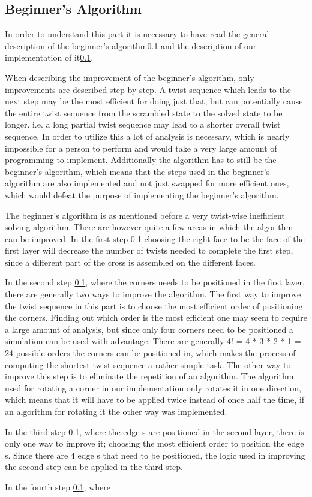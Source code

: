

\subsection{Beginner's Algorithm} %
In order to understand this part it is necessary to have read the general description of the beginner's algorithm\ref{} and the description of our implementation of it\ref{}. 

When describing the improvement of the beginner's algorithm, only improvements are described step by step. 
A twist sequence which leads to the next step may be the most efficient for doing just that, but can potentially cause the entire twist sequence from the scrambled state to the solved state to be longer. 
i.e. a long partial twist sequence may lead to a shorter overall twist sequence. In order to utilize this a lot of analysis is necessary, which is nearly impossible for a person to perform and would take a very large amount of programming to implement.
Additionally the algorithm has to still be the beginner's algorithm, which means that the steps used in the beginner's algorithm are also implemented and not just swapped for more efficient ones, which would defeat the purpose of implementing the beginner's algorithm.


The beginner's algorithm is as mentioned before a very twist-wise inefficient solving algorithm. 
There are however quite a few areas in which the algorithm can be improved.
In the first step \ref{} choosing the right face to be the face of the first layer will decrease the number of twists needed to complete the first step, since a different part of the cross is assembled on the different faces.

In the second step \ref{}, where the corners needs to be positioned in the first layer, there are generally two ways to improve the algorithm.
The first way to improve the twist sequence in this part is to choose the most efficient order of positioning the corners.
Finding out which order is the most efficient one may seem to require a large amount of analysis, but since only four corners need to be positioned a simulation can be used with advantage. %
There are generally 4! = 4 * 3 * 2 * 1 = 24 possible orders the corners can be positioned in, which makes the process of computing the shortest twist sequence a rather simple task. %
The other way to improve this step is to eliminate the repetition of an algorithm. The algorithm used for rotating a corner \cpiece{} in our implementation only rotates it in one direction, which means that it will have to be applied twice instead of once half the time, if an algorithm for rotating it the other way was implemented.

In the third step \ref{}, where the edge \cpiece{}s are positioned in the second layer, there is only one way to improve it; choosing the most efficient order to position the edge \cpiece{}s. Since there are 4 edge \cpiece{}s that need to be positioned, the logic used in improving the second step can be applied in the third step.

In the fourth step \ref{}, where